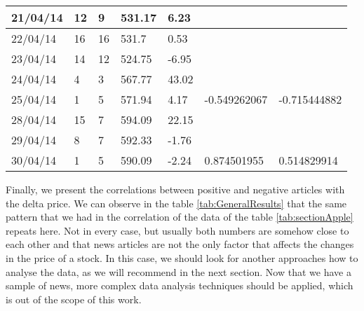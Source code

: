 \begin{table}
\begin{tabular}{ | p{1.8cm\textwidth} | p{1cm\textwidth} | p{1cm\textwidth} | p{1.1cm\textwidth} | p{1.1cm\textwidth} | p{2.5cm\textwidth} | p{2.5cm\textwidth} |}
21/04/14 & 12   & 9    & 531.17 & 6.23         &                    &                     \\\hline
22/04/14 & 16   & 16   & 531.7  & 0.53         &                    &                     \\\hline
23/04/14 & 14   & 12   & 524.75 & -6.95        &                    &                     \\\hline
24/04/14 & 4    & 3    & 567.77 & 43.02        &                    &                     \\\hline
25/04/14 & 1    & 5    & 571.94 & 4.17         & -0.549262067       & -0.715444882        \\\hline
28/04/14 & 15   & 7    & 594.09 & 22.15        &                    &                     \\\hline
29/04/14 & 8    & 7    & 592.33 & -1.76        &                    &                     \\\hline
30/04/14 & 1    & 5    & 590.09 & -2.24        & 0.874501955        & 0.514829914    \\\hline    

    \end{tabular}
\end{table}

Finally, we present the correlations between positive and negative articles with the delta price. We can observe in the table \ref{tab:GeneralResults} that the same pattern that we had in the correlation of the data of the table \ref{tab:sectionApple} repeats here. Not in every case, but usually both numbers are somehow close to each other and that news articles are not the only factor that affects the changes in the price of a stock. In this case, we should look for another approaches how to analyse the data, as we will recommend in the next section. Now that we have a sample of news, more complex data analysis techniques should be applied, which is out of the scope of this work.

